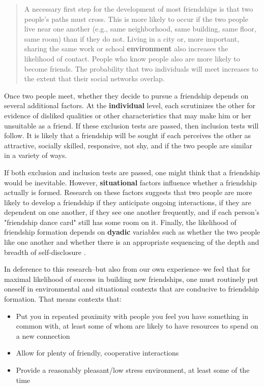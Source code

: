 \documentclass[12pt,letterpaper]{book}
\begin{document}
\begin{quotation}
	A necessary first step for the development of most friendships is that two people's paths must cross. This is more likely to occur if the two people live near one another (e.g., same neighborhood, same building, same floor, same room) than if they do not. Living in a city or, more important, sharing the same work or school \textbf{environment} also increases the likelihood of contact. People who know people also are more likely to become friends. The probability that two individuals will meet increases to the extent that their social networks overlap.
\end{quotation}

Once two people meet, whether they decide to pursue a friendship depends on several additional factors. At the \textbf{individual} level, each scrutinizes the other for evidence of disliked qualities or other characteristics that may make him or her unsuitable as a friend. If these exclusion tests are passed, then inclusion tests will follow. It is likely that a friendship will be sought if each perceives the other as attractive, socially skilled, responsive, not shy, and if the two people are similar in a variety of ways.

If both exclusion and inclusion tests are passed, one might think that a friendship would be inevitable. However, \textbf{situational} factors influence whether a friendship actually is formed. Research on these factors suggests that two people are more likely to develop a friendship if they anticipate ongoing interactions, if they are dependent on one another, if they see one another frequently, and if each person's "friendship dance card" still has some room on it. Finally, the likelihood of friendship formation depends on \textbf{dyadic} variables such as whether the two people like one another and whether there is an appropriate sequencing of the depth and breadth of self-disclosure \cite[p. 68]{fehr2008friendship}.

In deference to this research–but also from our own experience–we feel that for maximal likelihood of success in building new friendships, one must routinely put oneself in environmental and situational contexts that are conducive to friendship formation. That means contexts that:
\begin{itemize}
	\item Put you in repeated proximity with people you feel you have something in common with, at least some of whom are likely to have resources to spend on a new connection
	\item Allow for plenty of friendly, cooperative interactions
	\item Provide a reasonably pleasant/low stress environment, at least some of the time
\end{itemize}
\end{document}

